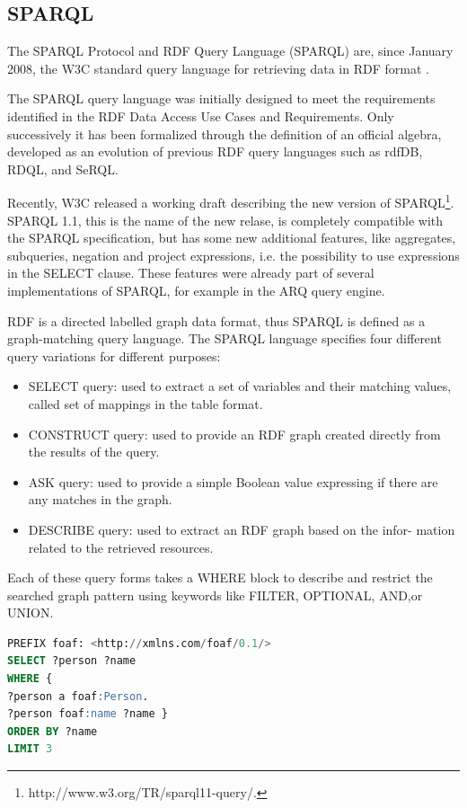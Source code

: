 \subsection{SPARQL}\label{sec:sparql}

The SPARQL Protocol and RDF Query Language (SPARQL) are, since January 2008, the W3C standard query language for retrieving data in RDF format \cite{prudhommeaux_sparql_2008}.

The SPARQL query language was initially designed to meet the requirements identified in the RDF Data Access Use Cases and Requirements. Only successively it has been formalized through the definition of an official algebra, developed as an evolution of previous RDF query languages such as rdfDB, RDQL, and SeRQL.

Recently, W3C released a working draft describing the new version of SPARQL\footnote{http://www.w3.org/TR/sparql11-query/.}. SPARQL 1.1, this is the name of the new relase, is completely compatible with the SPARQL specification, but has some new additional features, like aggregates, subqueries, negation and project expressions, i.e. the possibility to use expressions in the SELECT clause. These features were already part of several implementations of SPARQL, for example in the ARQ query engine. 

RDF is a directed labelled graph data format, thus SPARQL is defined as a graph-matching query language. The SPARQL language specifies four different query variations for different purposes:
\begin{itemize}
\item SELECT query: used to extract a set of variables and their matching values, called set of mappings in the table format.
\item CONSTRUCT query: used to provide an RDF graph created directly from the results of the query.
\item ASK query: used to provide a simple Boolean value expressing if there are any matches in the graph.
\item DESCRIBE query: used to extract an RDF graph based on the infor- mation related to the retrieved resources.
\end{itemize}

Each of these query forms takes a WHERE block to describe and restrict the searched graph pattern using keywords like FILTER, OPTIONAL, AND,or UNION.

\begin{lstlisting}[language=SQL, caption=An example of a simple SPARQL query , keywords={PREFIX,SELECT,WHERE,ORDER,BY, LIMIT }, label=code:sparql]
PREFIX foaf: <http://xmlns.com/foaf/0.1/> 
SELECT ?person ?name
WHERE {
?person a foaf:Person.
?person foaf:name ?name }
ORDER BY ?name 
LIMIT 3
\end{lstlisting}


